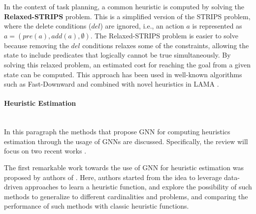 In the context of task planning, a common heuristic is computed by solving the \textbf{Relaxed-STRIPS} problem. This is a simplified version of the STRIPS problem, where the delete conditions ($del$) are ignored, i.e., an action $a$ is represented as $a = \left(pre(a), add(a), \emptyset \right)$. The Relaxed-STRIPS problem is easier to solve because removing the $del$ conditions relaxes some of the constraints, allowing the state to include predicates that logically cannot be true simultaneously. By solving this relaxed problem, an estimated cost for reaching the goal from a given state can be computed. This approach has been used in well-known algorithms such as Fast-Downward \cite{helmert2006fast} and combined with novel heuristics in LAMA \cite{richter2010lama}.

\paragraph*{Heuristic Estimation}\mbox{}\\
In this paragraph the methods that propose GNN for computing heuristics estimation through the usage of GNNs are discussed. Specifically, the review will focus on two recent works \cite{shen2020learning,chen2024learning}.

The first remarkable work towards the use of GNN for heuristic estimation was proposed by authors of \cite{shen2020learning}. Here, authors started from the idea to leverage data-driven approaches to learn a heuristic function, and explore the possibility of such methods to generalize to different cardinalities and problems, and comparing the performance of such methods with classic heuristic functions.

